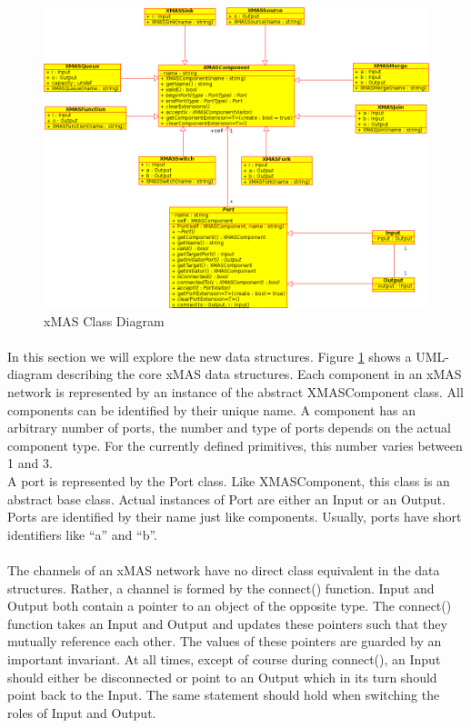 \documentclass[a4paper,11pt]{article}
\begin{document}
\begin{figure}[h]
 \includegraphics[width=\textwidth]{images/xmas-components}
 \caption{xMAS Class Diagram}
 \label{fig:xmas-components}
\end{figure}

\paragraph{}
In this section we will explore the new data structures. Figure \ref{fig:xmas-components} shows a
UML-diagram describing the core xMAS data structures. Each component in an xMAS network is represented
by an instance of the abstract XMASComponent class. All components can be identified by their unique name.
A component has an arbitrary number of ports, the number and type of ports depends on the actual
component type. For the currently defined primitives, this number varies between 1 and 3.\\
A port is represented by the Port class. Like XMASComponent, this class is an abstract base class. Actual instances
of Port are either an Input or an Output. Ports are identified by their name just like components.
Usually, ports have short identifiers like ``a'' and ``b''. 
\paragraph{}
The channels of an xMAS network have no direct class equivalent in the data structures. Rather, a channel is
formed by the connect() function. Input and Output both contain a pointer to an object of the opposite type.
The connect() function takes an Input and Output and updates these pointers such that they mutually
reference each other. The values of these pointers are guarded by an important invariant. At all times, 
except of course during connect(), an Input should either be disconnected or point to an Output which
in its turn should point back to the Input. The same statement should hold when switching the roles of
Input and Output.
\end{document}
